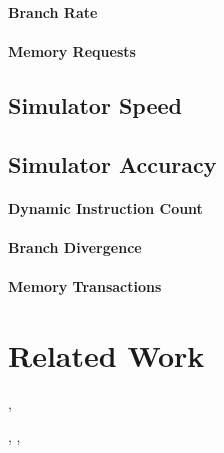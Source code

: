 \documentclass[conference, 10pt]{IEEEtran}
\begin{document}
\paragraph{Branch Rate}

\paragraph{Memory Requests}

\subsection{Simulator Speed}

\subsection{Simulator Accuracy}

\paragraph{Dynamic Instruction Count}

\paragraph{Branch Divergence}

\paragraph{Memory Transactions}

\label{sec:experiments}

\section{Related Work}
\label{sec:related-work}

\cite{ref:ptl-sim}, \cite{ref:simple-scalar}



\cite{ref:ramp}

\cite{ref:ocelot-pact}

\cite{ref:pdes}, \cite{ref:multi-threaded-sim},
\cite{ref:cuda-simulation-of-many-core}
\end{document}
